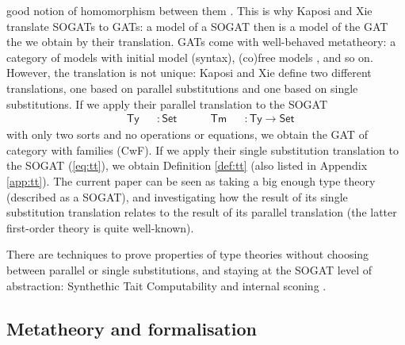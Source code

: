 \documentclass[a4paper,UKenglish,cleveref, autoref, thm-restate]{lipics-v2021}
\newcommand{\ra}{\rightarrow}
\newcommand{\Set}{\mathsf{Set}}
\newcommand{\Ty}{\mathsf{Ty}}
\newcommand{\Tm}{\mathsf{Tm}}
\begin{document}
good notion of homomorphism between them \cite[bottom of page 5]{DBLP:conf/fscd/KaposiX24}. This is why Kaposi and Xie
\cite{DBLP:conf/fscd/KaposiX24} translate SOGATs to GATs: a model of a
SOGAT then is a model of the GAT the we obtain by their
translation. GATs come with well-behaved metatheory: a category of
models with initial model (syntax), (co)free models
\cite{andras,DBLP:phd/hal/Moeneclaey22}, and so on. However, the
translation is not unique: Kaposi and Xie
\cite{DBLP:conf/fscd/KaposiX24} define two different translations, one
based on parallel substitutions and one based on single
substitutions. If we apply their parallel translation to the SOGAT
\begin{equation}\label{eq:tytm}
\begin{alignedat}{10}
  & \Ty && : \Set \hspace{3em} \Tm && : \Ty \ra\Set
\end{alignedat}
\end{equation}
with only two sorts and no operations or equations, we obtain the GAT
of category with families (CwF). If we apply their single substitution
translation to the SOGAT (\ref{eq:tt}), we obtain Definition
\ref{def:tt} (also listed in Appendix \ref{app:tt}). The current paper
can be seen as taking a big enough type theory (described as a SOGAT),
and investigating how the result of its single substitution
translation relates to the result of its parallel translation (the
latter first-order theory is quite well-known).

There are techniques to prove properties of type theories without
choosing between parallel or single substitutions, and staying at the
SOGAT level of abstraction: Synthethic Tait Computability
\cite{DBLP:phd/us/Sterling22} and internal sconing
\cite{DBLP:conf/fscd/BocquetKS23}.

\subsection{Metatheory and formalisation}\label{sec:metatheory}
\end{document}
